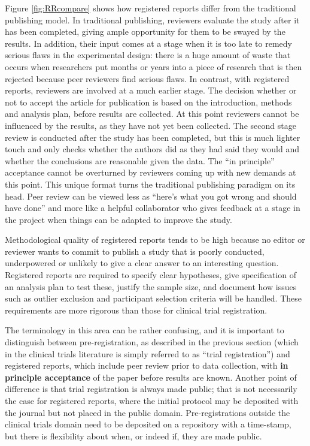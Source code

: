 \documentclass{krantz}
\begin{document}
Figure \ref{fig:RRcompare} shows how registered reports differ from the traditional publishing model. In traditional publishing, reviewers evaluate the study after it has been completed, giving ample opportunity for them to be swayed by the results. In addition, their input comes at a stage when it is too late to remedy serious flaws in the experimental design: there is a huge amount of waste that occurs when researchers put months or years into a piece of research that is then rejected because peer reviewers find serious flaws. In contrast, with registered reports, reviewers are involved at a much earlier stage. The decision whether or not to accept the article for publication is based on the introduction, methods and analysis plan, before results are collected. At this point reviewers cannot be influenced by the results, as they have not yet been collected. The second stage review is conducted after the study has been completed, but this is much lighter touch and only checks whether the authors did as they had said they would and whether the conclusions are reasonable given the data. The ``in principle'' acceptance cannot be overturned by reviewers coming up with new demands at this point. This unique format turns the traditional publishing paradigm on its head. Peer review can be viewed less as ``here's what you got wrong and should have done'' and more like a helpful collaborator who gives feedback at a stage in the project when things can be adapted to improve the study.

Methodological quality of registered reports tends to be high because no editor or reviewer wants to commit to publish a study that is poorly conducted, underpowered or unlikely to give a clear answer to an interesting question. Registered reports are required to specify clear hypotheses, give specification of an analysis plan to test these, justify the sample size, and document how issues such as outlier exclusion and participant selection criteria will be handled. These requirements are more rigorous than those for clinical trial registration.

The terminology in this area can be rather confusing, and it is important to distinguish between pre-registration, as described in the previous section (which in the clinical trials literature is simply referred to as ``trial registration'') and registered reports, which include peer review prior to data collection, with \textbf{in principle acceptance} of the paper before results are known. Another point of difference is that trial registration is always made public; that is not necessarily the case for registered reports, where the initial protocol may be deposited with the journal but not placed in the public domain. Pre-registrations outside the clinical trials domain need to be deposited on a repository with a time-stamp, but there is flexibility about when, or indeed if, they are made public.
\end{document}
